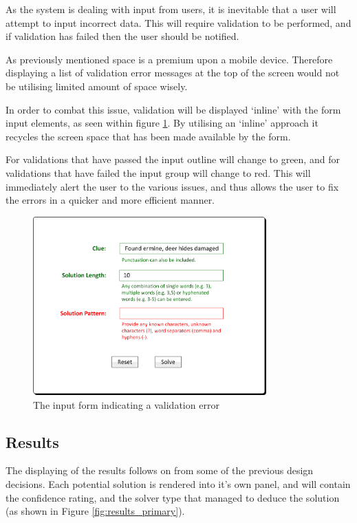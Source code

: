 As the system is dealing with input from users, it is inevitable that a user 
will attempt to input incorrect data. This will require validation to be 
performed, and if validation has failed then the user should be notified. 

As previously mentioned space is a premium upon a mobile device. Therefore 
displaying a list of validation error messages at the top of the screen would 
not be utilising limited amount of space wisely.

In order to combat this issue, validation will be displayed `inline' with the 
form input elements, as seen within figure \ref{fig:input_form_error}. By 
utilising an `inline' approach it recycles the screen space that has been made 
available by the form.

For validations that have passed the input outline will change to green, and for
validations that have failed the input group will change to red. This will 
immediately alert the user to the various issues, and thus allows the user to 
fix the errors in a quicker and more efficient manner.

\begin{figure}[H]
  \centering
  \includegraphics[width=0.8\textwidth]{design/ui/form_error.jpg}
  \caption{The input form indicating a validation error}
  \label{fig:input_form_error}
\end{figure}


\subsection{Results} 
\label{sub:results}

The displaying of the results follows on from some of the previous design 
decisions. Each potential solution is rendered into it's own panel, and will 
contain the confidence rating, and the solver type that managed to deduce the 
solution (as shown in Figure \ref{fig:results_primary}).

